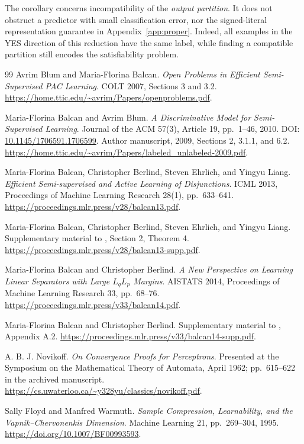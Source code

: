 \documentclass[11pt,a4paper]{article}
\theoremstyle{remark}
\newcommand{\1}{\mathbf 1}
\begin{document}
The corollary concerns incompatibility of the \emph{output partition}.
It does not obstruct a predictor with small classification error, nor the
signed-literal representation guarantee in Appendix~\ref{app:proper}.
Indeed, all examples in the YES direction of this reduction have the same
label, while finding a compatible partition still encodes the satisfiability
problem.

\begin{thebibliography}{99}
Avrim Blum and Maria-Florina Balcan.
\emph{Open Problems in Efficient Semi-Supervised PAC Learning}.
COLT 2007, Sections 3 and 3.2.
\url{https://home.ttic.edu/~avrim/Papers/openproblems.pdf}.

Maria-Florina Balcan and Avrim Blum.
\emph{A Discriminative Model for Semi-Supervised Learning}.
Journal of the ACM 57(3), Article 19, pp.~1--46, 2010.
DOI: \href{https://doi.org/10.1145/1706591.1706599}{10.1145/1706591.1706599}.
Author manuscript, 2009, Sections 2, 3.1.1, and 6.2.
\url{https://home.ttic.edu/~avrim/Papers/labeled_unlabeled-2009.pdf}.

Maria-Florina Balcan, Christopher Berlind, Steven Ehrlich, and Yingyu Liang.
\emph{Efficient Semi-supervised and Active Learning of Disjunctions}.
ICML 2013, Proceedings of Machine Learning Research 28(1), pp.~633--641.
\url{https://proceedings.mlr.press/v28/balcan13.pdf}.

Maria-Florina Balcan, Christopher Berlind, Steven Ehrlich, and Yingyu Liang.
Supplementary material to \cite{bbel2013}, Section 2, Theorem 4.
\url{https://proceedings.mlr.press/v28/balcan13-supp.pdf}.

Maria-Florina Balcan and Christopher Berlind.
\emph{A New Perspective on Learning Linear Separators with Large
$L_qL_p$ Margins}.
AISTATS 2014, Proceedings of Machine Learning Research 33, pp.~68--76.
\url{https://proceedings.mlr.press/v33/balcan14.pdf}.

Maria-Florina Balcan and Christopher Berlind.
Supplementary material to \cite{bb2014}, Appendix A.2.
\url{https://proceedings.mlr.press/v33/balcan14-supp.pdf}.

A. B. J. Novikoff.
\emph{On Convergence Proofs for Perceptrons}.
Presented at the Symposium on the Mathematical Theory of Automata,
April 1962; pp.~615--622 in the archived manuscript.
\url{https://cs.uwaterloo.ca/~y328yu/classics/novikoff.pdf}.

Sally Floyd and Manfred Warmuth.
\emph{Sample Compression, Learnability, and the Vapnik--Chervonenkis Dimension}.
Machine Learning 21, pp.~269--304, 1995.
\url{https://doi.org/10.1007/BF00993593}.


\end{thebibliography}
\end{document}
